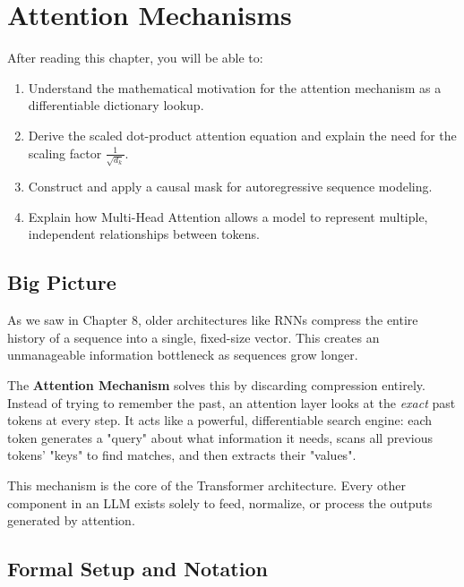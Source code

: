 \chapter{Attention Mechanisms}
\label{ch:09}

\begin{keyinsight}
After reading this chapter, you will be able to:
\begin{enumerate}
  \item Understand the mathematical motivation for the attention mechanism as a differentiable dictionary lookup.
  \item Derive the scaled dot-product attention equation and explain the need for the scaling factor $\frac{1}{\sqrt{d_k}}$.
  \item Construct and apply a causal mask for autoregressive sequence modeling.
  \item Explain how Multi-Head Attention allows a model to represent multiple, independent relationships between tokens.
\end{enumerate}
\end{keyinsight}

\section{Big Picture}
\label{ch:09:sec:big_picture}

As we saw in Chapter 8, older architectures like RNNs compress the entire history of a sequence into a single, fixed-size vector. This creates an unmanageable information bottleneck as sequences grow longer.

The \textbf{Attention Mechanism} solves this by discarding compression entirely. Instead of trying to remember the past, an attention layer looks at the \emph{exact} past tokens at every step. It acts like a powerful, differentiable search engine: each token generates a "query" about what information it needs, scans all previous tokens' "keys" to find matches, and then extracts their "values". 

This mechanism is the core of the Transformer architecture. Every other component in an LLM exists solely to feed, normalize, or process the outputs generated by attention.

\section{Formal Setup and Notation}
\label{ch:09:sec:setup}


